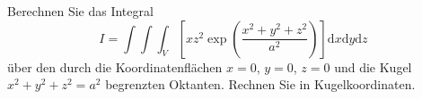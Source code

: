 \begin{atiTask}[
  title = Volumenberechnung II
]
  \providecommand{\D}{\mathrm{d}}
Berechnen Sie das Integral
\[
I=\int \int \int_V\left[xz^2\exp{\left(\frac{x^2+y^2+z^2}{a^2}\right)}\right] \D x\D y\D z
\]
über den durch die Koordinatenflächen $x=0$, $y=0$, $z=0$ und die Kugel $x^2+y^2+z^2=a^2$ begrenzten Oktanten. Rechnen Sie in Kugelkoordinaten.

\atiNote{Es ist \[
\int t^2e^{\alpha t}\; \D t=\frac{e^{\alpha t}\left(\alpha^2t^2-2\alpha t+2\right)}{\alpha^3}+C
\]}
\end{atiTask}